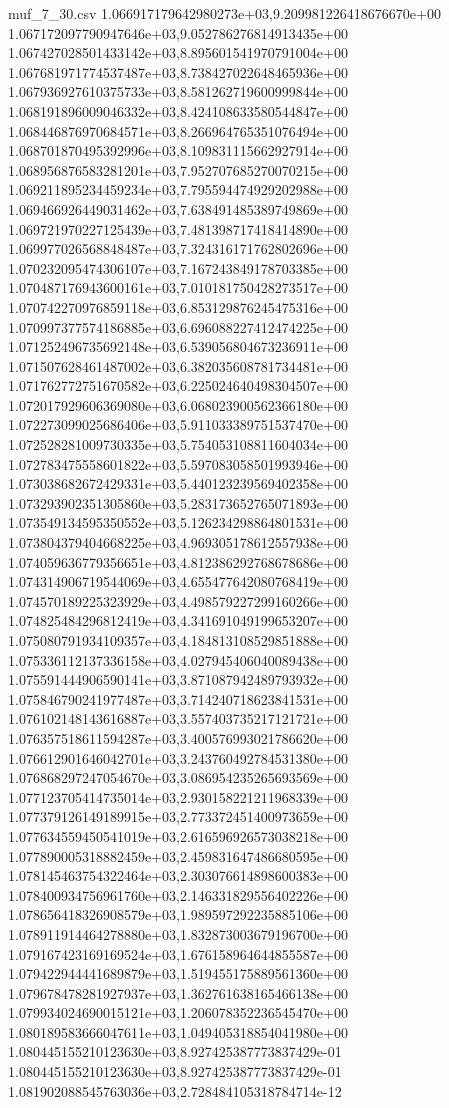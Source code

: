 \begin{filecontents*}{muf_7_30.csv}
1.066917179642980273e+03,9.209981226418676670e+00
1.067172097790947646e+03,9.052786276814913435e+00
1.067427028501433142e+03,8.895601541970791004e+00
1.067681971774537487e+03,8.738427022648465936e+00
1.067936927610375733e+03,8.581262719600999844e+00
1.068191896009046332e+03,8.424108633580544847e+00
1.068446876970684571e+03,8.266964765351076494e+00
1.068701870495392996e+03,8.109831115662927914e+00
1.068956876583281201e+03,7.952707685270070215e+00
1.069211895234459234e+03,7.795594474929202988e+00
1.069466926449031462e+03,7.638491485389749869e+00
1.069721970227125439e+03,7.481398717418414890e+00
1.069977026568848487e+03,7.324316171762802696e+00
1.070232095474306107e+03,7.167243849178703385e+00
1.070487176943600161e+03,7.010181750428273517e+00
1.070742270976859118e+03,6.853129876245475316e+00
1.070997377574186885e+03,6.696088227412474225e+00
1.071252496735692148e+03,6.539056804673236911e+00
1.071507628461487002e+03,6.382035608781734481e+00
1.071762772751670582e+03,6.225024640498304507e+00
1.072017929606369080e+03,6.068023900562366180e+00
1.072273099025686406e+03,5.911033389751537470e+00
1.072528281009730335e+03,5.754053108811604034e+00
1.072783475558601822e+03,5.597083058501993946e+00
1.073038682672429331e+03,5.440123239569402358e+00
1.073293902351305860e+03,5.283173652765071893e+00
1.073549134595350552e+03,5.126234298864801531e+00
1.073804379404668225e+03,4.969305178612557938e+00
1.074059636779356651e+03,4.812386292768678686e+00
1.074314906719544069e+03,4.655477642080768419e+00
1.074570189225323929e+03,4.498579227299160266e+00
1.074825484296812419e+03,4.341691049199653207e+00
1.075080791934109357e+03,4.184813108529851888e+00
1.075336112137336158e+03,4.027945406040089438e+00
1.075591444906590141e+03,3.871087942489793932e+00
1.075846790241977487e+03,3.714240718623841531e+00
1.076102148143616887e+03,3.557403735217121721e+00
1.076357518611594287e+03,3.400576993021786620e+00
1.076612901646042701e+03,3.243760492784531380e+00
1.076868297247054670e+03,3.086954235265693569e+00
1.077123705414735014e+03,2.930158221211968339e+00
1.077379126149189915e+03,2.773372451400973659e+00
1.077634559450541019e+03,2.616596926573038218e+00
1.077890005318882459e+03,2.459831647486680595e+00
1.078145463754322464e+03,2.303076614898600383e+00
1.078400934756961760e+03,2.146331829556402226e+00
1.078656418326908579e+03,1.989597292235885106e+00
1.078911914464278880e+03,1.832873003679196700e+00
1.079167423169169524e+03,1.676158964644855587e+00
1.079422944441689879e+03,1.519455175889561360e+00
1.079678478281927937e+03,1.362761638165466138e+00
1.079934024690015121e+03,1.206078352236545470e+00
1.080189583666047611e+03,1.049405318854041980e+00
1.080445155210123630e+03,8.927425387773837429e-01
1.080445155210123630e+03,8.927425387773837429e-01
1.081902088545763036e+03,2.728484105318784714e-12
\end{filecontents*}

